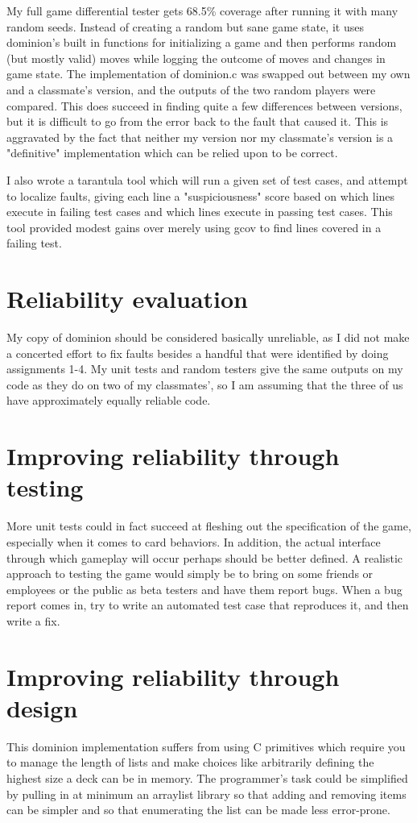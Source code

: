 \documentclass[11pt]{article}
\begin{document}
My full game differential tester gets 68.5\% coverage after running it with many random seeds. Instead of creating a random but sane game state, it uses dominion's built in functions for initializing a game and then performs random (but mostly valid) moves while logging the outcome of moves and changes in game state. The implementation of dominion.c was swapped out between my own and a classmate's version, and the outputs of the two random players were compared. This does succeed in finding quite a few differences between versions, but it is difficult to go from the error back to the fault that caused it. This is aggravated by the fact that neither my version nor my classmate's version is a "definitive" implementation which can be relied upon to be correct.

I also wrote a tarantula tool which will run a given set of test cases, and attempt to localize faults, giving each line a "suspiciousness" score based on which lines execute in failing test cases and which lines execute in passing test cases. This tool provided modest gains over merely using gcov to find lines covered in a failing test.

\section{Reliability evaluation}
My copy of dominion should be considered basically unreliable, as I did not make a concerted effort to fix faults besides a handful that were identified by doing assignments 1-4. My unit tests and random testers give the same outputs on my code as they do on two of my classmates', so I am assuming that the three of us have approximately equally reliable code.

\section{Improving reliability through testing}
More unit tests could in fact succeed at fleshing out the specification of the game, especially when it comes to card behaviors. In addition, the actual interface through which gameplay will occur perhaps should be better defined. A realistic approach to testing the game would simply be to bring on some friends or employees or the public as beta testers and have them report bugs. When a bug report comes in, try to write an automated test case that reproduces it, and then write a fix.

\section{Improving reliability through design}
This dominion implementation suffers from using C primitives which require you to manage the length of lists and make choices like arbitrarily defining the highest size a deck can be in memory. The programmer's task could be simplified by pulling in at minimum an arraylist library so that adding and removing items can be simpler and so that enumerating the list can be made less error-prone.
\end{document}
